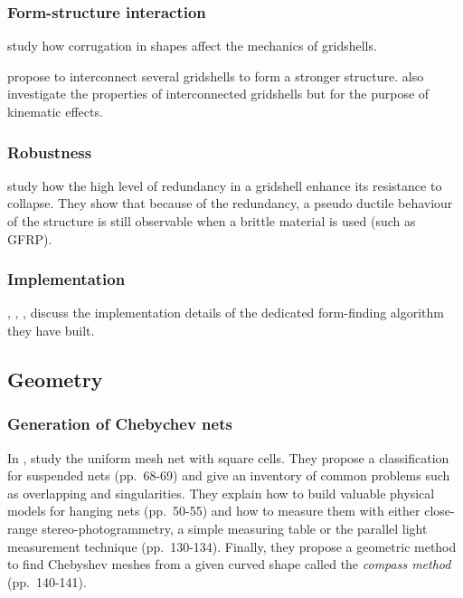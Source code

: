 \subsubsection{Form-structure interaction}

 study how corrugation in shapes affect the mechanics of gridshells.

 propose to interconnect several gridshells to form a stronger structure.  also investigate the properties of interconnected gridshells but for the purpose of kinematic effects.

\subsubsection{Robustness}

\citet{Tayeb2013} study how the high level of redundancy in a gridshell enhance its resistance to collapse. They show that because of the redundancy, a pseudo ductile behaviour of the structure is still observable when a brittle material is used (such as GFRP).

\subsubsection{Implementation}

, , ,  discuss the implementation details of the dedicated form-finding algorithm they have built.

\subsection{Geometry}

\subsubsection{Generation of Chebychev nets}

In ,  study the uniform mesh net with square cells. They propose a classification for suspended nets (pp.~68-69) and give an inventory of common problems such as overlapping and singularities. They explain how to build valuable physical models for hanging nets (pp.~50-55) and how to measure them with either close-range stereo-photogrammetry, a simple measuring table or the parallel light measurement technique (pp.~130-134). Finally, they propose a geometric method to find Chebyshev meshes from a given curved shape called the \emph{compass method} (pp.~140-141).

